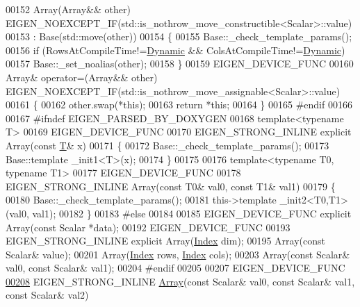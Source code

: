 \begin{DoxyCode}
00152     Array(Array&& other) EIGEN\_NOEXCEPT\_IF(std::is\_nothrow\_move\_constructible<Scalar>::value)
00153       : Base(std::move(other))
00154     \{
00155       Base::\_check\_template\_params();
00156       \textcolor{keywordflow}{if} (RowsAtCompileTime!=\hyperlink{namespace_eigen_ad81fa7195215a0ce30017dfac309f0b2}{Dynamic} && ColsAtCompileTime!=\hyperlink{namespace_eigen_ad81fa7195215a0ce30017dfac309f0b2}{Dynamic})
00157         Base::\_set\_noalias(other);
00158     \}
00159     EIGEN\_DEVICE\_FUNC
00160     Array& operator=(Array&& other) EIGEN\_NOEXCEPT\_IF(std::is\_nothrow\_move\_assignable<Scalar>::value)
00161     \{
00162       other.swap(*\textcolor{keyword}{this});
00163       \textcolor{keywordflow}{return} *\textcolor{keyword}{this};
00164     \}
00165 \textcolor{preprocessor}{#endif}
00166 
00167 \textcolor{preprocessor}{    #ifndef EIGEN\_PARSED\_BY\_DOXYGEN}
00168     \textcolor{keyword}{template}<\textcolor{keyword}{typename} T>
00169     EIGEN\_DEVICE\_FUNC
00170     EIGEN\_STRONG\_INLINE \textcolor{keyword}{explicit} Array(\textcolor{keyword}{const} \hyperlink{group___sparse_core___module}{T}& x)
00171     \{
00172       Base::\_check\_template\_params();
00173       Base::template \_init1<T>(x);
00174     \}
00175 
00176     \textcolor{keyword}{template}<\textcolor{keyword}{typename} T0, \textcolor{keyword}{typename} T1>
00177     EIGEN\_DEVICE\_FUNC
00178     EIGEN\_STRONG\_INLINE Array(\textcolor{keyword}{const} T0& val0, \textcolor{keyword}{const} T1& val1)
00179     \{
00180       Base::\_check\_template\_params();
00181       this->\textcolor{keyword}{template} \_init2<T0,T1>(val0, val1);
00182     \}
00183 \textcolor{preprocessor}{    #else}
00184 
00185     EIGEN\_DEVICE\_FUNC \textcolor{keyword}{explicit} Array(\textcolor{keyword}{const} Scalar *data);
00192     EIGEN\_DEVICE\_FUNC
00193     EIGEN\_STRONG\_INLINE \textcolor{keyword}{explicit} Array(\hyperlink{namespace_eigen_a62e77e0933482dafde8fe197d9a2cfde}{Index} dim);
00195     Array(\textcolor{keyword}{const} Scalar& value);
00201     Array(\hyperlink{namespace_eigen_a62e77e0933482dafde8fe197d9a2cfde}{Index} rows, \hyperlink{namespace_eigen_a62e77e0933482dafde8fe197d9a2cfde}{Index} cols);
00203     Array(\textcolor{keyword}{const} Scalar& val0, \textcolor{keyword}{const} Scalar& val1);
00204 \textcolor{preprocessor}{    #endif}
00205 
00207     EIGEN\_DEVICE\_FUNC
\hyperlink{group___core___module_adefff5a86babb44c362bd799c1cda965}{00208}     EIGEN\_STRONG\_INLINE \hyperlink{group___core___module_adefff5a86babb44c362bd799c1cda965}{Array}(\textcolor{keyword}{const} Scalar& val0, \textcolor{keyword}{const} Scalar& val1, \textcolor{keyword}{const} Scalar& val2)

\end{DoxyCode}
